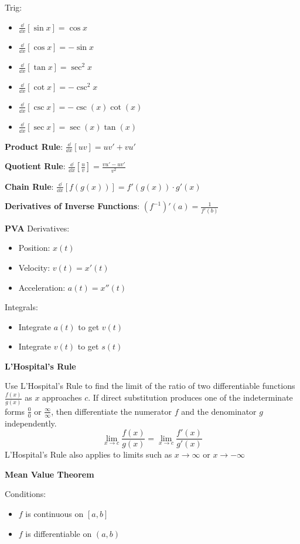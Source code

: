 \documentclass[10pt,a4paper,oneside]{book}
\begin{document}
Trig:
\begin{itemize}
    \item $\frac{\dd}{\dd x}[\sin x]=\cos x$
    \item $\frac{\dd}{\dd x}[\cos x]=-\sin x$
    \item $\frac{\dd}{\dd x}[\tan x]=\sec^2 x$
    \item $\frac{\dd}{\dd x}[\cot x]=-\csc^2 x$
    \item $\frac{\dd}{\dd x}[\csc x]=-\csc(x)\cot(x)$
    \item $\frac{\dd}{\dd x}[\sec x]=\sec(x)\tan(x)$
\end{itemize}

\textbf{Product Rule}: $\frac{\dd}{\dd x}[uv]=uv'+vu'$

\textbf{Quotient Rule}: $\frac{\dd}{\dd x}[\frac{u}{v}]=\frac{vu'-uv'}{v^2}$

\textbf{Chain Rule}: $\frac{\dd}{\dd x}[f(g(x))] = f'(g(x))\cdot g'(x)$

\textbf{Derivatives of Inverse Functions}: $(f^{-1})'(a)=\frac{1}{f'(b)}$

\textbf{PVA}
Derivatives:
\begin{itemize}
    \item Position: $x(t)$
    \item Velocity: $v(t)=x'(t)$
    \item Acceleration: $a(t)=x''(t)$
\end{itemize}

Integrals:
\begin{itemize}
    \item Integrate $a(t)$ to get $v(t)$
    \item Integrate $v(t)$ to get $s(t)$
\end{itemize}

\textbf{L'Hospital's Rule}

Use L'Hospital's Rule to find the limit of the ratio of two differentiable functions $\frac{f(x)}{g(x)}$ as $x$ approaches $c$.
If direct substitution produces one of the indeterminate forms $\frac{0}{0}$ or $\frac{\infty}{\infty}$, then differentiate the numerator $f$ and the denominator $g$ independently.
\[ \lim_{x\to c}\frac{f(x)}{g(x)}=\lim_{x\to c}\frac{f'(x)}{g'(x)} \]
L'Hospital's Rule also applies to limits such as $x\rightarrow \infty$ or $x\rightarrow -\infty$

\textbf{Mean Value Theorem}

Conditions:
\begin{itemize}
    \item $f$ is continuous on $[a,b]$
    \item $f$ is differentiable on $(a,b)$
\end{itemize}
\end{document}
